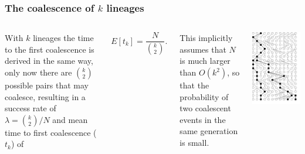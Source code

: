 \begin{frame}
\begin{columns}
\end{columns}

\end{frame}

\begin{frame}
\frametitle{The coalescence of $k$ lineages}

\begin{columns}


With $k$ lineages the time to the first coalescence is derived in the same way,
only now there are $\binom{k}{2}$ possible pairs that may coalesce, resulting in
a success rate of $\lambda = \binom{k}{2}/N$ and mean time to first coalescence ($t_k$) of

\begin{equation*}
E[t_k] = \frac{N}{\binom{k}{2}}.
\end{equation*}

This implicitly assumes that $N$ is much larger than $O(k^2)$, so that the probability
of two coalescent events in the same generation is small.


\includegraphics[scale=0.25]{../images/wfCoalescent3}

\end{columns}

\end{frame}



